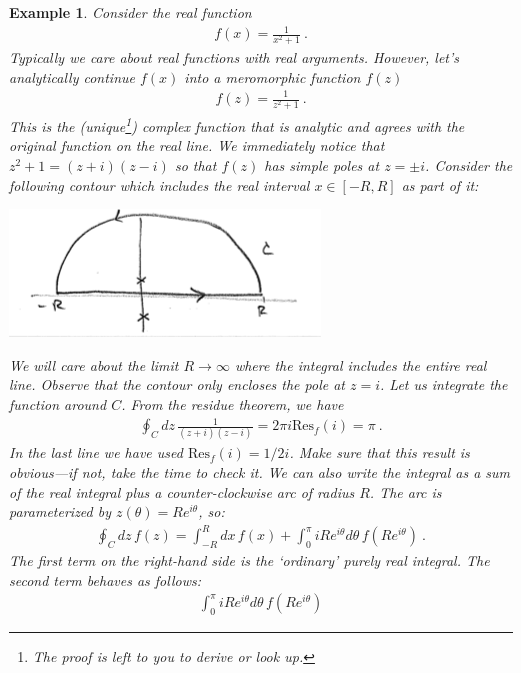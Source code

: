 \documentclass[
  11pt,
	colorful,
	raggedright,
]{tufte-style-thesis-flip}
\newtheorem{example}{Example}[section]
\begin{document}
\begin{example}
Consider the real function
\begin{align}
  f(x) = \frac{1}{x^2 +1} \ .
\end{align}
Typically we care about real functions with real arguments. However, let's \emph{analytically continue} $f(x)$ into a meromorphic function $f(z)$
\begin{align}
  f(z) = \frac{1}{z^2+1} \ .
\end{align}
This is the (unique\footnote{The proof is left to you to derive or look up.}) complex function that is analytic and agrees with the original function on the real line. We immediately notice that $z^2+1 = (z+i)(z-i)$ so that $f(z)$ has simple poles at $z=\pm i$. Consider the following contour which includes the real interval $x\in [-R,R]$ as part of it:
\begin{center}
\includegraphics[width=.7\textwidth]{figures/Lec_2017_14_contour.png}
\end{center}
We will care about the limit $R\to \infty$ where the integral includes the entire real line.
Observe that the contour only encloses the pole at $z=i$. Let us integrate the function around $C$. From the residue theorem, we have
\begin{align}
  \oint_Cdz\, \frac{1}{(z+i)(z-i)} 
  = 2\pi i \text{Res}_f(i) 
  = \pi \ .
\end{align}
In the last line we have used $\text{Res}_f(i)=1/2i$. Make sure that this result is obvious---if not, take the time to check it. We can also write the integral as a sum of the real integral plus a counter-clockwise arc of radius $R$. The arc is parameterized by $z(\theta) = Re^{i\theta}$, so:
\begin{align}
  \oint_C dz\, f(z) = \int_{-R}^R dx\, f(x) 
  + \int_0^\pi iR e^{i\theta} d\theta  \, f\left(Re^{i\theta}\right) \ .
\end{align}
The first term on the right-hand side is the `ordinary' purely real integral. The second term behaves as follows:
\begin{align}
  \int_0^\pi iR e^{i\theta} d\theta  \, f\left(Re^{i\theta}\right)

\end{align}
\end{example}
\end{document}

